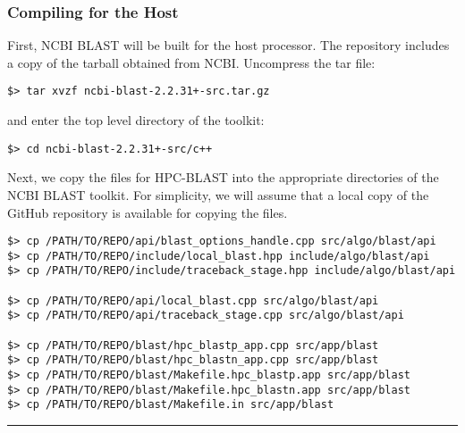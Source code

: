 \documentclass[10pt]{article}
\begin{document}
\subsubsection{Compiling for the Host} \label{sssec:ncbi-host}
First, NCBI BLAST will be built for the host processor.  The repository includes a copy of the tarball obtained from NCBI.
Uncompress the tar file:
\begin{verbatim}
$> tar xvzf ncbi-blast-2.2.31+-src.tar.gz
\end{verbatim}
\noindent and enter the top level directory of the toolkit:
\begin{verbatim}
$> cd ncbi-blast-2.2.31+-src/c++
\end{verbatim}
\noindent Next, we copy the files for HPC-BLAST into the appropriate directories of the NCBI BLAST toolkit.  
For simplicity, we will assume that a local copy of the
GitHub repository is available for copying the files.  
\footnotesize
\begin{verbatim}
$> cp /PATH/TO/REPO/api/blast_options_handle.cpp src/algo/blast/api
$> cp /PATH/TO/REPO/include/local_blast.hpp include/algo/blast/api
$> cp /PATH/TO/REPO/include/traceback_stage.hpp include/algo/blast/api

$> cp /PATH/TO/REPO/api/local_blast.cpp src/algo/blast/api
$> cp /PATH/TO/REPO/api/traceback_stage.cpp src/algo/blast/api

$> cp /PATH/TO/REPO/blast/hpc_blastp_app.cpp src/app/blast
$> cp /PATH/TO/REPO/blast/hpc_blastn_app.cpp src/app/blast
$> cp /PATH/TO/REPO/blast/Makefile.hpc_blastp.app src/app/blast
$> cp /PATH/TO/REPO/blast/Makefile.hpc_blastn.app src/app/blast
$> cp /PATH/TO/REPO/blast/Makefile.in src/app/blast
\end{verbatim}
\normalsize

\noindent \rule{16cm}{0.4pt}
\end{document}
